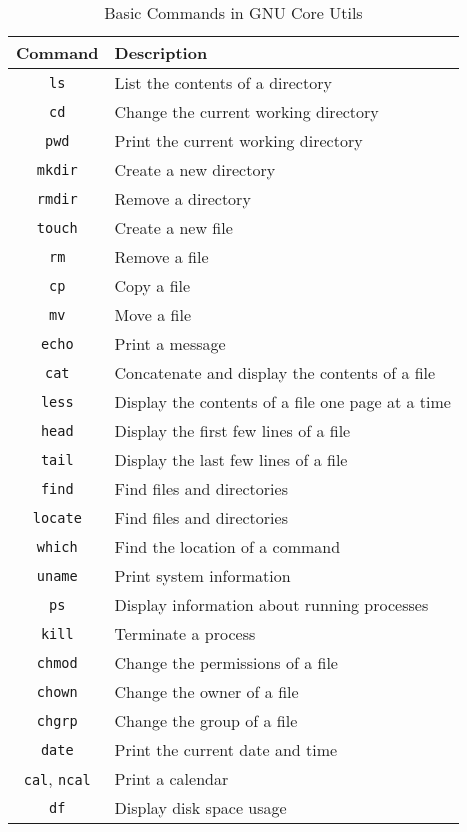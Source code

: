 \begin{table*}[h!]
\caption{Basic Commands in GNU Core Utils}
\begin{tabular}{ c l }
  \toprule
 Command & Description \\
 \midrule
  \lstinline|ls| & List the contents of a directory \\
  \lstinline|cd| & Change the current working directory \\
  \lstinline|pwd| & Print the current working directory \\
  \lstinline|mkdir| & Create a new directory \\
  \lstinline|rmdir| & Remove a directory \\
  \lstinline|touch| & Create a new file \\
  \lstinline|rm| & Remove a file \\
  \lstinline|cp| & Copy a file \\
  \lstinline|mv| & Move a file \\
  \lstinline|echo| & Print a message \\
  \lstinline|cat| & Concatenate and display the contents of a file \\
  \lstinline|less| & Display the contents of a file one page at a time \\
  \lstinline|head| & Display the first few lines of a file \\
  \lstinline|tail| & Display the last few lines of a file \\
  \lstinline|find| & Find files and directories \\
  \lstinline|locate| & Find files and directories \\
  \lstinline|which| & Find the location of a command \\
  \lstinline|uname| & Print system information \\
  \lstinline|ps| & Display information about running processes \\
  \lstinline|kill| & Terminate a process \\
  \lstinline|chmod| & Change the permissions of a file \\
  \lstinline|chown| & Change the owner of a file \\
  \lstinline|chgrp| & Change the group of a file \\
  \lstinline|date| & Print the current date and time \\
  \lstinline|cal|, \lstinline|ncal| & Print a calendar \\
  \lstinline|df| & Display disk space usage \\

\end{tabular}
\end{table*}
